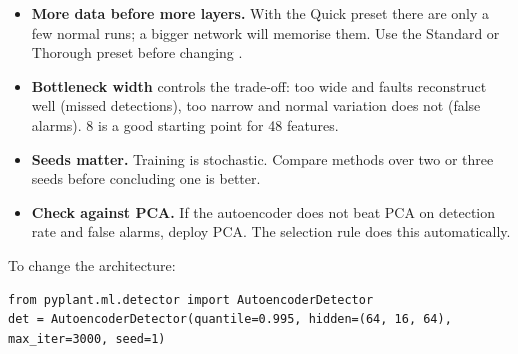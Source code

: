 \begin{itemize}
  \item \textbf{More data before more layers.} With the Quick preset there are
        only a few normal runs; a bigger network will memorise them. Use the
        Standard or Thorough preset before changing .
  \item \textbf{Bottleneck width} controls the trade-off: too wide and faults
        reconstruct well (missed detections), too narrow and normal variation
        does not (false alarms). 8 is a good starting point for 48 features.
  \item \textbf{Seeds matter.} Training is stochastic. Compare methods over
        two or three seeds before concluding one is better.
  \item \textbf{Check against PCA.} If the autoencoder does not beat PCA on
        detection rate and false alarms, deploy PCA. The selection rule does
        this automatically.
\end{itemize}

To change the architecture:
\begin{lstlisting}
from pyplant.ml.detector import AutoencoderDetector
det = AutoencoderDetector(quantile=0.995, hidden=(64, 16, 64), max_iter=3000, seed=1)
\end{lstlisting}
